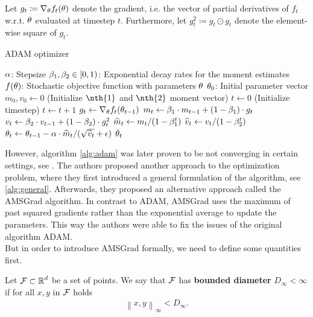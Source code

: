 \begin{algorithm}[H]
Let $g_t\coloneqq \nabla_{\theta}f_t(\theta)$ denote the gradient, i.e. the vector of partial derivatives of $f_t$ w.r.t. $\theta$ evaluated at timestep $t$. Furthermore,  let $g_t^2 \coloneqq g_t \odot g_t$ denote the element-wise square of $g_t$.
\caption{ADAM optimizer}\label{alg:adam}
\begin{algorithmic}[1]
\Require $\alpha$: Stepsize
\Require $\beta_1,\beta_2\in [0,1)$: Exponential decay rates for the moment estimates
\Require $f(\theta)$: Stochastic objective function with parameters $\theta$
\Require $\theta_0$: Initial parameter vector
\State $m_0,v_0 \gets 0$ (Initialize $\nth{1}$ and $\nth{2}$ moment vector)
\State $t \gets 0$ (Initialize timestep)
\State $t\gets t+1$
\State $g_t \gets \nabla_{\theta}f_t(\theta_{t-1})$ 
\State $m_t \gets\beta_1 \cdot m_{t-1} + (1-\beta_1)\cdot g_t$ 
\State $v_t \gets\beta_2 \cdot v_{t-1} + (1-\beta_2)\cdot g_t^2$ 
\State $\widehat{m}_t \gets m_t/(1-\beta_1^t)$ 
\State $\widehat{v}_t \gets v_t/(1-\beta_2^t)$ 
\State $\theta_t \gets \theta_{t-1} - \alpha\cdot \widehat{m}_t / (\sqrt{\widehat{v}_t} + \operatorname{\epsilon})$ 
\EndWhile
\State \Return $\theta_t$ 
\end{algorithmic}
\end{algorithm}

However, algorithm \ref{alg:adam} was later proven to be not converging in certain settings, see \cite{reddi2019convergence}. The authors proposed another approach to the optimization problem, where they first introduced a general formulation of the algorithm, see \ref{alg:general}. Afterwards, they proposed an alternative approach called the AMSGrad algorithm. In contrast to ADAM, AMSGrad uses the maximum of past squared gradients rather than the exponential average to update the parameters. This way the authors were able to fix the issues of the original algorithm ADAM.\\
But in order to introduce AMSGrad formally, we need to define some quantities first.

\begin{definition}
Let $\operatorname{\mathcal{F}}\subset\operatorname{\mathbb{R}}^d$ be a set of points. We say that $\operatorname{\mathcal{F}}$ has \textbf{bounded diameter} $D_{\infty}<\infty$ if for all $x,y$ in $\operatorname{\mathcal{F}}$ holds
\begin{align*}
\left\|x, y \right\|_{\infty} < D_{\infty}.
\end{align*}
\end{definition}

